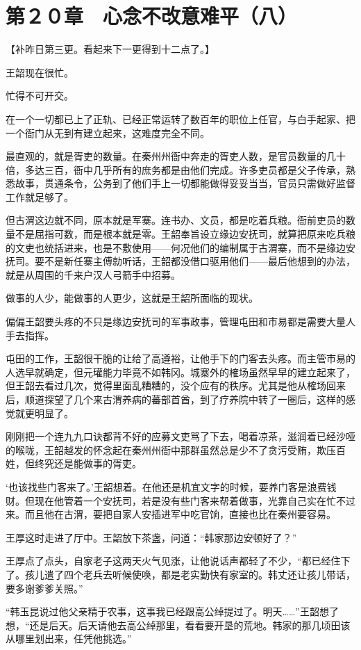 \section{第２０章　心念不改意难平（八）}

【补昨日第三更。看起来下一更得到十二点了。】

王韶现在很忙。

忙得不可开交。

在一个一切都已上了正轨、已经正常运转了数百年的职位上任官，与白手起家、把一个衙门从无到有建立起来，这难度完全不同。

最直观的，就是胥吏的数量。在秦州州衙中奔走的胥吏人数，是官员数量的几十倍，多达三百，衙中几乎所有的庶务都是由他们完成。许多吏员都是父子传承，熟悉故事，贯通条令，公务到了他们手上一切都能做得妥妥当当，官员只需做好监督工作就足够了。

但古渭这边就不同，原本就是军寨。连书办、文员，都是吃着兵粮。衙前吏员的数量不是屈指可数，而是根本就是零。王韶奉旨设立缘边安抚司，就算把原来吃兵粮的文吏也统括进来，也是不敷使用——何况他们的编制属于古渭寨，而不是缘边安抚司。要不是新任寨主傅勍听话，王韶都没借口驱用他们——最后他想到的办法，就是从周围的千来户汉人弓箭手中招募。

做事的人少，能做事的人更少，这就是王韶所面临的现状。

偏偏王韶要头疼的不只是缘边安抚司的军事政事，管理屯田和市易都是需要大量人手去指挥。

屯田的工作，王韶很干脆的让给了高遵裕，让他手下的门客去头疼。而主管市易的人选早就确定，但元瓘能力毕竟不如韩冈。城寨外的榷场虽然早早的建立起来了，但王韶去看过几次，觉得里面乱糟糟的，没个应有的秩序。尤其是他从榷场回来后，顺道探望了几个来古渭养病的蕃部首酋，到了疗养院中转了一圈后，这样的感觉就更明显了。

刚刚把一个连九九口诀都背不好的应募文吏骂了下去，喝着凉茶，滋润着已经沙哑的喉咙，王韶越发的怀念起在秦州州衙中那群虽然总是少不了贪污受贿，欺压百姓，但终究还是能做事的胥吏。

‘也该找些门客来了。’王韶想着。在他还是机宜文字的时候，要养门客是浪费钱财。但现在他管着一个安抚司，若是没有些门客来帮着做事，光靠自己实在忙不过来。而且他在古渭，要把自家人安插进军中吃官饷，直接也比在秦州要容易。

王厚这时走进了厅中。王韶放下茶盏，问道：“韩家那边安顿好了？”

王厚点了点头，自家老子这两天火气见涨，让他说话声都轻了不少，“都已经住下了。孩儿遣了四个老兵去听候使唤，都是老实勤快有家室的。韩丈还让孩儿带话，要多谢爹爹关照。”

“韩玉昆说过他父亲精于农事，这事我已经跟高公绰提过了。明天……”王韶想了想，“还是后天。后天请他去高公绰那里，看看要开垦的荒地。韩家的那几顷田该从哪里划出来，任凭他挑选。”

